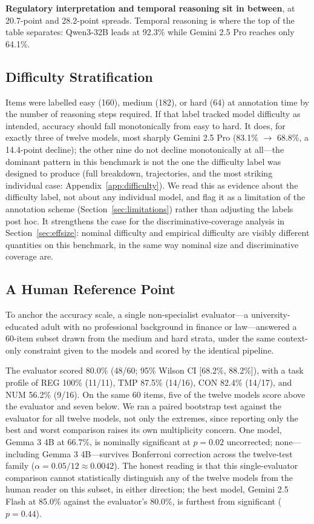 \textbf{Regulatory interpretation and temporal reasoning sit in between}, at 20.7-point and
28.2-point spreads. Temporal reasoning is where the top of the table separates: Qwen3-32B leads at
92.3\% while Gemini 2.5 Pro reaches only 64.1\%.

\subsection{Difficulty Stratification}
\label{sec:difficulty}

Items were labelled easy (160), medium (182), or hard (64) at annotation time by the number of
reasoning steps required. If that label tracked model difficulty as intended, accuracy should fall
monotonically from easy to hard. It does, for exactly three of twelve models, most sharply Gemini 2.5
Pro (83.1\% $\to$ 68.8\%, a 14.4-point decline); the other nine do not decline monotonically at
all---the dominant pattern in this benchmark is not the one the difficulty label was designed to
produce (full breakdown, trajectories, and the most striking individual case:
Appendix~\ref{app:difficulty}). We read this as evidence about the difficulty label, not about any
individual model, and flag it as a limitation of the annotation scheme
(Section~\ref{sec:limitations}) rather than adjusting the labels post hoc. It strengthens the case
for the discriminative-coverage analysis in Section~\ref{sec:effsize}: nominal difficulty and
empirical difficulty are visibly different quantities on this benchmark, in the same way nominal
size and discriminative coverage are.

\subsection{A Human Reference Point}
\label{sec:human}

To anchor the accuracy scale, a single non-specialist evaluator---a university-educated adult with
no professional background in finance or law---answered a 60-item subset drawn from the medium and
hard strata, under the same context-only constraint given to the models and scored by the identical
pipeline.

The evaluator scored 80.0\% (48/60; 95\% Wilson CI [68.2\%, 88.2\%]), with a task profile of
REG 100\% (11/11), TMP 87.5\% (14/16), CON 82.4\% (14/17), and NUM 56.2\% (9/16). On the same 60
items, five of the twelve models score above the evaluator and seven below. We ran a paired
bootstrap test against the evaluator for all twelve models, not only the extremes, since reporting
only the best and worst comparison raises its own multiplicity concern. One model, Gemma 3 4B at
66.7\%, is nominally significant at $p = 0.02$ uncorrected; none---including Gemma 3 4B---survives
Bonferroni correction across the twelve-test family ($\alpha = 0.05/12 \approx 0.0042$). The honest
reading is that this single-evaluator comparison cannot statistically distinguish any of the twelve
models from the human reader on this subset, in either direction; the best model, Gemini 2.5 Flash
at 85.0\% against the evaluator's 80.0\%, is furthest from significant ($p = 0.44$).

